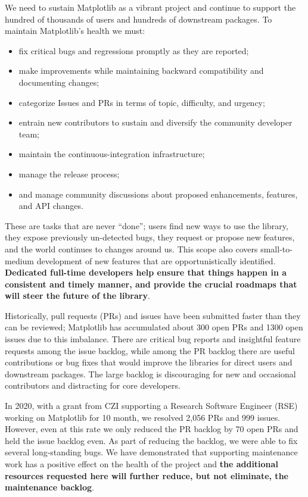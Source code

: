 \documentclass[12pt]{article}
\numberwithin{page}{section}
\begin{document}
We need to sustain Matplotlib as a vibrant project and continue to support the
hundred of thousands of users and hundreds of downstream packages.  To maintain
Matplotlib's health we must:
\begin{itemize}[noitemsep]
\item fix critical bugs and regressions promptly as they are reported;
\item make improvements while maintaining backward compatibility and
  documenting changes;
\item categorize Issues and PRs in terms of topic, difficulty, and
  urgency;
\item entrain new contributors to sustain and diversify the community
  developer team;
\item maintain the continuous-integration infrastructure;
\item manage the release process;
\item and manage community discussions about proposed enhancements, features,
  and API changes.
\end{itemize}
These are tasks that are never ``done''; users find new ways to use the
library, they expose previously un-detected bugs, they request or propose new
features, and the world continues to changes around us.  This scope also covers
small-to-medium development of new features that are opportunistically
identified.  \textbf{Dedicated full-time developers help ensure that things
  happen in a consistent and timely manner, and provide the crucial roadmaps
  that will steer the future of the library}.



Historically, pull requests (PRs) and issues have been submitted
faster than they can be reviewed; Matplotlib has accumulated about 300
open PRs and 1300 open issues due to this imbalance. There are
critical bug reports and insightful feature requests among the issue
backlog, while among the PR backlog there are useful contributions or
bug fixes that would improve the libraries for direct users and
downstream packages.  The large backlog is discouraging for new and
occasional contributors and distracting for core developers.


In 2020, with a grant from CZI supporting a Research Software Engineer
(RSE) working on Matplotlib for 10 month, we resolved 2,056 PRs and
999 issues.  However, even at this rate we only reduced the PR backlog
by 70 open PRs and held the issue backlog even.  As part of reducing
the backlog, we were able to fix several long-standing bugs.  We have
demonstrated that supporting maintenance work has a positive effect on
the health of the project and \textbf{the additional resources
  requested here will further reduce, but not eliminate, the
  maintenance backlog}.
\end{document}

